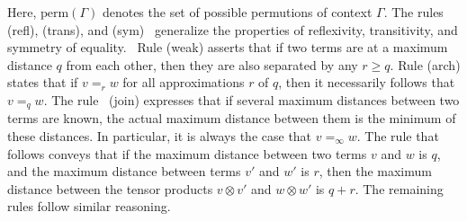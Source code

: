 Here, $\text{perm} (\Gamma)$ denotes the set of possible permutions of context $\Gamma$. The rules (refl), (trans), and (sym)  generalize the properties of reflexivity, transitivity, and symmetry of equality.  Rule (weak) asserts that if two terms are at a maximum distance $q$ from each other, then they are also separated by any $r \geq q$. Rule (arch) states that if $v =_r w$ for all approximations $r$ of $q$, then it necessarily follows that $v =_q w$. The rule  (join) expresses that if several maximum distances between two terms are known, the actual maximum distance between them is the minimum of these distances. In particular, it is always the
 case that $v =_{\infty} w$.  The rule that follows conveys that if the maximum distance between two terms $v$ and $w$ is $q$, and the maximum distance between terms $v'$ and $w'$ is $r$, then the maximum distance between the tensor products $v \otimes v'$ and $w \otimes w'$ is $q + r$. The remaining rules follow similar reasoning.



